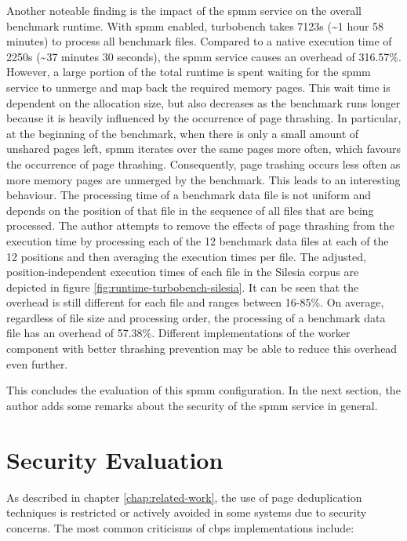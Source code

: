 Another noteable finding is the impact of the \ac{spmm} service on the overall benchmark runtime.
With \ac{spmm} enabled, turbobench takes 7123s (\textasciitilde{}1 hour 58 minutes) to process all benchmark files.
Compared to a native execution time of 2250s (\textasciitilde{}37 minutes 30 seconds), the \ac{spmm} service causes an overhead of 316.57\%.
However, a large portion of the total runtime is spent waiting for the \ac{spmm} service to unmerge and map back the required memory pages.
This wait time is dependent on the allocation size, but also decreases as the benchmark runs longer because it is heavily influenced by the occurrence of page thrashing.
In particular, at the beginning of the benchmark, when there is only a small amount of unshared pages left, \ac{spmm} iterates over the same pages more often, which favours the occurrence of page thrashing.
Consequently, page trashing occurs less often as more memory pages are unmerged by the benchmark.
This leads to an interesting behaviour.
The processing time of a benchmark data file is not uniform and depends on the position of that file in the sequence of all files that are being processed.
The author attempts to remove the effects of page thrashing from the execution time by processing each of the 12 benchmark data files at each of the 12 positions and then averaging the execution times per file.
The adjusted, position-independent execution times of each file in the Silesia corpus are depicted in figure \ref{fig:runtime-turbobench-silesia}.
It can be seen that the overhead is still different for each file and ranges between 16-85\%.
On average, regardless of file size and processing order, the processing of a benchmark data file has an overhead of 57.38\%.
Different implementations of the worker component with better thrashing prevention may be able to reduce this overhead even further.

This concludes the evaluation of this \ac{spmm} configuration.
In the next section, the author adds some remarks about the security of the \ac{spmm} service in general.

\section{Security Evaluation}
\label{sec:security-evaluation}

As described in chapter \ref{chap:related-work}, the use of page deduplication techniques is restricted or actively avoided in some systems due to security concerns.
The most common criticisms of \ac{cbps} implementations include:

